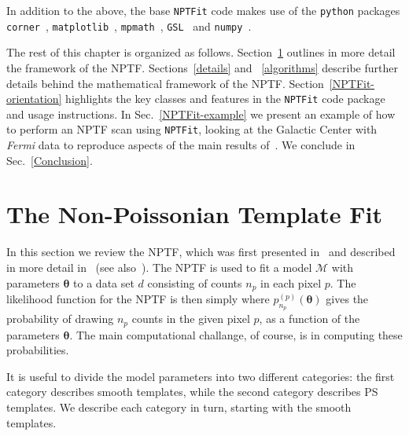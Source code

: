 In addition to the above, the base \texttt{NPTFit} code makes use of the \texttt{python} packages \texttt{corner}~\cite{dan_foreman_mackey_2016_53155}, \texttt{matplotlib}~\cite{Hunter:2007}, \texttt{mpmath}~\cite{mpmath}, \texttt{GSL}~\cite{galassi2015gnu} and  \texttt{numpy}~\cite{oliphant2006guide}.

The rest of this chapter is organized as follows.  Section~\ref{NPTF} outlines in more detail the framework of the NPTF. Sections~\ref{details} and ~\ref{algorithms} describe further details behind the mathematical framework of the NPTF. Section~\ref{NPTFit-orientation} highlights the key classes and features in the \texttt{NPTFit} code package and usage instructions.  In Sec.~\ref{NPTFit-example} we present an example of how to perform an NPTF scan using \texttt{NPTFit}, looking at the Galactic Center with \emph{Fermi} data to reproduce aspects of the main results of~\cite{Lee:2015fea}. We conclude in Sec.~\ref{Conclusion}. 

\section{The Non-Poissonian Template Fit}
\label{NPTF}

In this section we review the NPTF, which was first presented in~\cite{Lee:2015fea} and described in more detail in~\cite{Linden:2016rcf,Lisanti:2016jub} (see also~\cite{Malyshev:2011zi,Lee:2014mza,Zechlin:2015wdz,Zechlin:2016pme}).  The NPTF is used to fit a model $\mathcal{M}$ with parameters $\bm{\theta}$ to a data set $d$ consisting of counts $n_p$ in each pixel $p$.  The likelihood function for the NPTF is then simply
where $p_{n_p}^{(p)}( {\bm \theta})$ gives the probability of drawing $n_p$ counts in the given pixel $p$, as a function of the parameters $\bm{\theta}$.  The main computational challange, of course, is in computing these probabilities.

It is useful to divide the model parameters into two different categories: the first category describes smooth templates, while the second category describes PS templates.  We describe each category in turn, starting with the smooth templates.  

